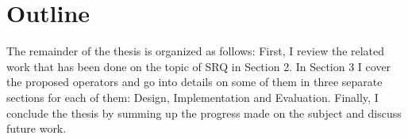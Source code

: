 \section{Outline}
The remainder of the thesis is organized as follows: First, I review the related work that has been done on the topic of SRQ in Section 2. In Section 3 I cover the proposed operators and go into details on some of them in three separate sections for each of them: Design, Implementation and Evaluation. Finally, I conclude the thesis by summing up the progress made on the subject and discuss future work.